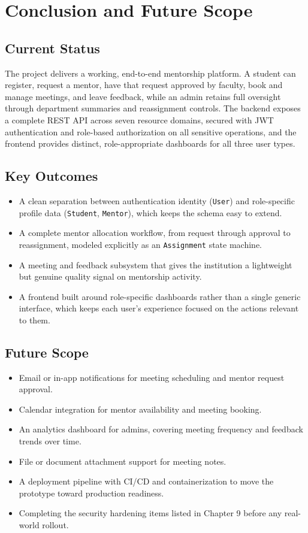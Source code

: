 \documentclass[12pt,a4paper]{report}
\newcommand{\sectionrule}{\vspace{-4pt}{\color{lightgray}\hrule height 1pt}\vspace{8pt}}
\begin{document}
\chapter{Conclusion and Future Scope}

\section{Current Status}
\sectionrule
The project delivers a working, end-to-end mentorship platform. A student can register, request a mentor, have that request approved by faculty, book and manage meetings, and leave feedback, while an admin retains full oversight through department summaries and reassignment controls. The backend exposes a complete REST API across seven resource domains, secured with JWT authentication and role-based authorization on all sensitive operations, and the frontend provides distinct, role-appropriate dashboards for all three user types.

\section{Key Outcomes}
\sectionrule
\begin{itemize}[itemsep=2pt]
  \item A clean separation between authentication identity (\texttt{User}) and role-specific profile data (\texttt{Student}, \texttt{Mentor}), which keeps the schema easy to extend.
  \item A complete mentor allocation workflow, from request through approval to reassignment, modeled explicitly as an \texttt{Assignment} state machine.
  \item A meeting and feedback subsystem that gives the institution a lightweight but genuine quality signal on mentorship activity.
  \item A frontend built around role-specific dashboards rather than a single generic interface, which keeps each user's experience focused on the actions relevant to them.
\end{itemize}

\section{Future Scope}
\sectionrule
\begin{itemize}[itemsep=2pt]
  \item Email or in-app notifications for meeting scheduling and mentor request approval.
  \item Calendar integration for mentor availability and meeting booking.
  \item An analytics dashboard for admins, covering meeting frequency and feedback trends over time.
  \item File or document attachment support for meeting notes.
  \item A deployment pipeline with CI/CD and containerization to move the prototype toward production readiness.
  \item Completing the security hardening items listed in Chapter 9 before any real-world rollout.
\end{itemize}
\end{document}
